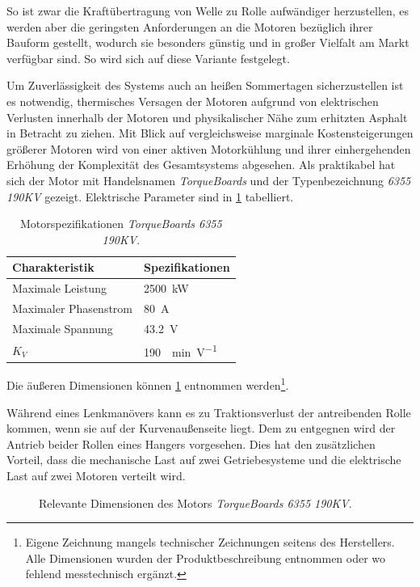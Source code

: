 	So ist zwar die Kraftübertragung von Welle zu Rolle aufwändiger herzustellen, es werden aber die geringsten Anforderungen an die Motoren bezüglich ihrer Bauform gestellt, wodurch sie besonders günstig und in großer Vielfalt am Markt verfügbar sind. So wird sich auf diese Variante festgelegt.\par\medskip
	Um Zuverlässigkeit des Systems auch an heißen Sommertagen sicherzustellen ist es notwendig, thermisches Versagen der Motoren aufgrund von elektrischen Verlusten innerhalb der Motoren und physikalischer Nähe zum erhitzten Asphalt in Betracht zu ziehen.
	Mit Blick auf vergleichsweise marginale Kostensteigerungen größerer Motoren wird von einer aktiven Motorkühlung und ihrer einhergehenden Erhöhung der Komplexität des Gesamtsystems abgesehen.
	Als praktikabel hat sich der Motor mit Handelsnamen \textit{TorqueBoards} und der Typenbezeichnung \textit{6355 190KV} gezeigt.
	Elektrische Parameter sind in \cref{tab:TB 6355 190KV electrical specs} tabelliert.
	\begin{table}[h]
		\caption[Motorspezifikationen \textit{TorqueBoards 6355 190KV}]{Motorspezifikationen \textit{TorqueBoards 6355 190KV}.}\label{tab:TB 6355 190KV electrical specs}
		\centering
		\begin{tabular}{@{}ll@{}}
			\toprule
			Charakteristik			& Spezifikationen\\ \midrule
			Maximale Leistung		& \qty{2500}{\kilo\watt} \\
			Maximaler Phasenstrom	& \qty{80}{\ampere} \\
			Maximale Spannung		& \qty{43,2}{\volt} \\
			\(K_V\)					& \qty{190}{\per\minute\per\volt} \\ \bottomrule
		\end{tabular}
	\end{table}
	Die äußeren Dimensionen können \cref{fig:motor} entnommen werden\footnote{Eigene Zeichnung mangels technischer Zeichnungen seitens des Herstellers.
	Alle Dimensionen wurden der Produktbeschreibung entnommen oder wo fehlend messtechnisch ergänzt.}.
	
	Während eines Lenkmanövers kann es zu Traktionsverlust der antreibenden Rolle kommen, wenn sie auf der Kurvenaußenseite liegt.
	Dem zu entgegnen wird der Antrieb beider Rollen eines Hangers vorgesehen.
	Dies hat den zusätzlichen Vorteil, dass die mechanische Last auf zwei Getriebesysteme und die elektrische Last auf zwei Motoren verteilt wird.
	\begin{figure}[h]
		\centering
		
		\caption{Relevante Dimensionen des Motors \textit{TorqueBoards 6355 190KV}.}%
		\label{fig:motor}
	\end{figure}
